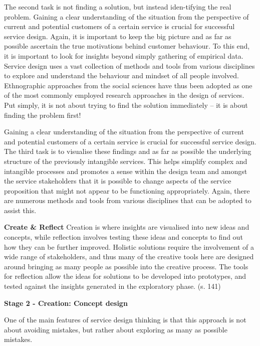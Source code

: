 The second task is not finding a solution, but instead iden-tifying the real problem. Gaining a clear understanding of the situation from the perspective of current and potential customers of a certain service is crucial for successful service design. Again, it is important to keep the big picture and as far as possible ascertain the true motivations behind customer behaviour. To this end, it is important to look for insights beyond simply gathering of empirical data. Service design uses a vast collection of methods and tools from various disciplines to explore and understand the behaviour and mindset of all people involved. Ethnographic approaches from the social sciences have thus been adopted as one of the most commonly employed research approaches in the design of services. Put simply, it is not about trying to find the solution immediately – it is about finding the problem first!

Gaining a clear understanding of the situation from the perspective of current and potential customers of a certain service is crucial for successful service design.
The third task is to visualise these findings and as far as possible the underlying structure of the previously intangible services. This helps simplify complex and intangible processes and promotes a sense within the design team and amongst the service stakeholders that it is possible to change aspects of the service proposition that might not appear to be functioning appropriately. Again, there are numerous methods and tools from various disciplines that can be adopted to assist this.

\textbf{Create \& Reflect}
Creation is where insights are visualised into new ideas and concepts, while reflection involves testing these ideas and concepts to find out how they can be further improved. Holistic solutions require the involvement of a wide range of stakeholders, and thus many of the creative tools here are designed around bringing as many people as possible into the creative process. The tools for reflection allow the ideas for solutions to be developed into prototypes, and tested against the insights generated in the exploratory phase. (s. 141)

\textbf{Stage 2 - Creation: Concept design}

One of the main features of service design thinking is that this
approach is not about avoiding mistakes, but rather about exploring as many as possible mistakes.

